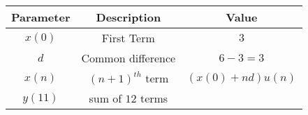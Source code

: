 \begin{tabular}{|c|c|c|}
\hline 
\textbf{Parameter}& \textbf{Description}& \textbf{Value}\\
\hline
$x(0)$ &First Term& $3$ \\
\hline
$d$ & Common difference & $6 - 3 = 3 $\\
\hline
$x(n) $& $(n+1)^{th}$ term & $(x(0)+nd)u(n)$\\
\hline
$y(11)$ & sum of $12$ terms & \\
\hline
\end{tabular}
